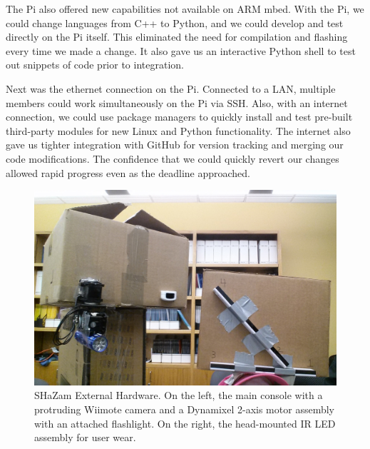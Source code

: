 \documentclass[conference, twocolumn]{IEEEtran}
\begin{document}
The Pi also offered new capabilities not available on ARM mbed. With the Pi, we could change languages from C++ to Python, and we could develop and test directly on the Pi itself. This eliminated the need for compilation and flashing every time we made a change. It also gave us an interactive Python shell to test out snippets of code prior to integration.

Next was the ethernet connection on the Pi. Connected to a LAN, multiple members could work simultaneously on the Pi via SSH. Also, with an internet connection, we could use package managers to quickly install and test pre-built third-party modules for new Linux and Python functionality. The internet also gave us tighter integration with GitHub for version tracking and merging our code modifications. The confidence that we could quickly revert our changes allowed rapid progress even as the deadline approached.


\begin{figure}[!t]
\begin{center}
\includegraphics[width=\linewidth]{../images/shazam_outer2}
\end{center}

\caption{SHaZam External Hardware. On the left, the main console with a protruding Wiimote camera and a Dynamixel 2-axis motor assembly with an attached flashlight. On the right, the head-mounted IR LED assembly for user wear.}
\label{fig:hw_mk0}
\end{figure}
\end{document}
